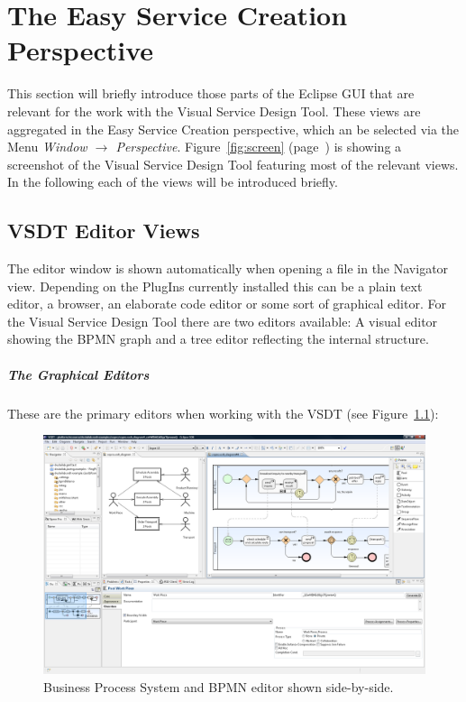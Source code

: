 \chapter{The Easy Service Creation Perspective}
\label{sec:user_perspective}

This section will briefly introduce those parts of the Eclipse GUI that are relevant for the work
with the Visual Service Design Tool. These views are aggregated in the Easy Service Creation
perspective, which an be selected via the Menu \emph{Window $\rightarrow$ Perspective}.
Figure~\ref{fig:screen} (page~\pageref{fig:screen}) is showing a screenshot of the Visual Service
Design Tool featuring most of the relevant views. In the following each of the views will be
introduced briefly.


\section{VSDT Editor Views}
\label{sec:user_perspective_editor}

The editor window is shown automatically when opening a file in the Navigator view. Depending on the
PlugIns currently installed this can be a plain text editor, a browser, an elaborate code editor or
some sort of graphical editor. For the Visual Service Design Tool there are two editors available: A
visual editor showing the BPMN graph and a tree editor reflecting the internal structure.  

\paragraph*{The Graphical Editors}
These are the primary editors when working with the VSDT (see Figure~\ref{fig:screen_meta}):

\begin{figure}
	\centering
	\includegraphics[height=.4\textheight]{figures/vsdt_1-2-0.png}
	\caption{Business Process System and BPMN editor shown side-by-side.}
	\label{fig:screen_meta}
\end{figure}

